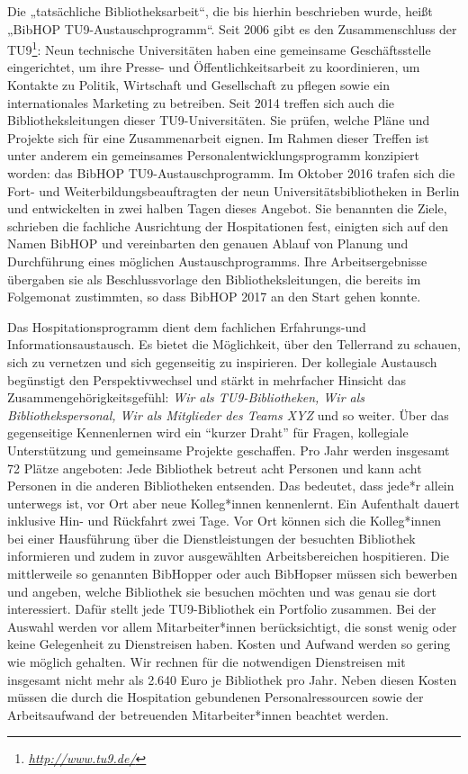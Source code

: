 \documentclass[a4paper,
fontsize=11pt,
oneside,
numbers=noperiodatend,
parskip=half-,
bibliography=totoc,
final
]{scrartcl}
\begin{document}
Die „tatsächliche Bibliotheksarbeit``, die bis hierhin beschrieben
wurde, heißt „BibHOP TU9-Austauschprogramm``. Seit 2006 gibt es den
Zusammenschluss der TU9\footnote{\href{http://www.tu9.de/}{\emph{http://www.tu9.de/}}}:
Neun technische Universitäten haben eine gemeinsame Geschäftsstelle
eingerichtet, um ihre Presse- und Öffentlichkeitsarbeit zu koordinieren,
um Kontakte zu Politik, Wirtschaft und Gesellschaft zu pflegen sowie ein
internationales Marketing zu betreiben. Seit 2014 treffen sich auch die
Bibliotheksleitungen dieser TU9-Universitäten. Sie prüfen, welche Pläne
und Projekte sich für eine Zusammenarbeit eignen. Im Rahmen dieser
Treffen ist unter anderem ein gemeinsames Personalentwicklungsprogramm
konzipiert worden: das BibHOP TU9-Austauschprogramm. Im Oktober 2016
trafen sich die Fort- und Weiterbildungsbeauftragten der neun
Universitätsbibliotheken in Berlin und entwickelten in zwei halben Tagen
dieses Angebot. Sie benannten die Ziele, schrieben die fachliche
Ausrichtung der Hospitationen fest, einigten sich auf den Namen BibHOP
und vereinbarten den genauen Ablauf von Planung und Durchführung eines
möglichen Austauschprogramms. Ihre Arbeitsergebnisse übergaben sie als
Beschlussvorlage den Bibliotheksleitungen, die bereits im Folgemonat
zustimmten, so dass BibHOP 2017 an den Start gehen konnte.

Das Hospitationsprogramm dient dem fachlichen Erfahrungs-und
Informationsaustausch. Es bietet die Möglichkeit, über den Tellerrand zu
schauen, sich zu vernetzen und sich gegenseitig zu inspirieren. Der
kollegiale Austausch begünstigt den Perspektivwechsel und stärkt in
mehrfacher Hinsicht das Zusammengehörigkeitsgefühl: \emph{Wir als
TU9-Bibliotheken, Wir als Bibliothekspersonal, Wir als Mitglieder des
Teams XYZ} und so weiter. Über das gegenseitige Kennenlernen wird ein
\enquote{kurzer Draht} für Fragen, kollegiale Unterstützung und
gemeinsame Projekte geschaffen. Pro Jahr werden insgesamt 72 Plätze
angeboten: Jede Bibliothek betreut acht Personen und kann acht Personen
in die anderen Bibliotheken entsenden. Das bedeutet, dass jede*r allein
unterwegs ist, vor Ort aber neue Kolleg*innen kennenlernt. Ein
Aufenthalt dauert inklusive Hin- und Rückfahrt zwei Tage. Vor Ort können
sich die Kolleg*innen bei einer Hausführung über die Dienstleistungen
der besuchten Bibliothek informieren und zudem in zuvor ausgewählten
Arbeitsbereichen hospitieren. Die mittlerweile so genannten BibHopper
oder auch BibHopser müssen sich bewerben und angeben, welche Bibliothek
sie besuchen möchten und was genau sie dort interessiert. Dafür stellt
jede TU9-Bibliothek ein Portfolio zusammen. Bei der Auswahl werden vor
allem Mitarbeiter*innen berücksichtigt, die sonst wenig oder keine
Gelegenheit zu Dienstreisen haben. Kosten und Aufwand werden so gering
wie möglich gehalten. Wir rechnen für die notwendigen Dienstreisen mit
insgesamt nicht mehr als 2.640 Euro je Bibliothek pro Jahr. Neben diesen
Kosten müssen die durch die Hospitation gebundenen Personalressourcen
sowie der Arbeitsaufwand der betreuenden Mitarbeiter*innen beachtet
werden.
\end{document}
